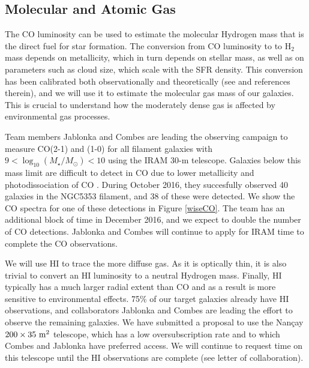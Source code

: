 \documentclass[11pt, preprint]{aastex}
\begin{document}
{%


\vspace*{-1cm}
\subsection{Molecular and Atomic Gas}
\vspace*{-.3cm}




The CO luminosity can be used to estimate the molecular Hydrogen mass
that is the direct fuel for star formation.  The conversion from CO
luminosity to to H$_2$ mass depends on metallicity, which in turn
depends on stellar mass, as well as on parameters such as cloud size,
which scale with the SFR density.  This conversion has been calibrated
both observationally and theoretically (see \citet{Bolatto13} and
references therein), and we will use it to estimate the molecular gas
mass of our galaxies.  This is crucial to understand how the moderately dense gas is affected by environmental gas processes.

Team members Jablonka and Combes are leading the observing campaign to
measure CO(2-1) and (1-0)  for all filament galaxies with $9 <
\log_{10}(M_\star/M_\odot) < 10$ using the IRAM 30-m telescope.
Galaxies below this mass limit are difficult to detect in CO due
to lower metallicity and photodissociation of CO
\citep[e.g.][]{cormier14}.   During October 2016, they succesfully observed 40 galaxies in the
NGC5353 filament, and 38 of these were detected.  We show the CO
spectra for one of these detections in Figure
\ref{wiseCO}.  The team has an additional block of time in December
2016, and we expect to double the number of CO detections.  Jablonka
and Combes will continue to apply for IRAM time to complete the CO observations.

We will use HI to trace the more diffuse gas.  As it is optically
thin, it is also trivial to convert an HI luminosity to a neutral
Hydrogen mass.  Finally, HI typically has a much larger radial extent
than CO and as a result is more sensitive to environmental effects.  
75\% of our target galaxies already have HI observations, and collaborators
Jablonka and Combes are leading the effort to observe the remaining galaxies.
We have submitted a proposal to use the Nan\c{c}ay $\rm 200 \times 35~m^2$
telescope, which has a low oversubscription rate and to which Combes
and Jablonka have
preferred access.  We will continue to request time on this telescope
until the HI observations are complete (see letter of collaboration).

}
\end{document}
